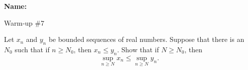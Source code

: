 \documentclass[12pt]{article}
\begin{document}
\noindent \textbf{Name:} 

\begin{center}
Warm-up \#7
\end{center}

\noindent Let $x_n$ and $y_n$ be bounded sequences of real numbers. Suppose that there is an $N_0$ such that if $n \geqslant N_0$, then $x_n \leqslant y_n$. Show that if $N \geqslant N_0$, then 
\[
\sup_{n \geqslant N} x_n \leqslant \sup_{n \geqslant N} y_n.
\] 
\end{document}

